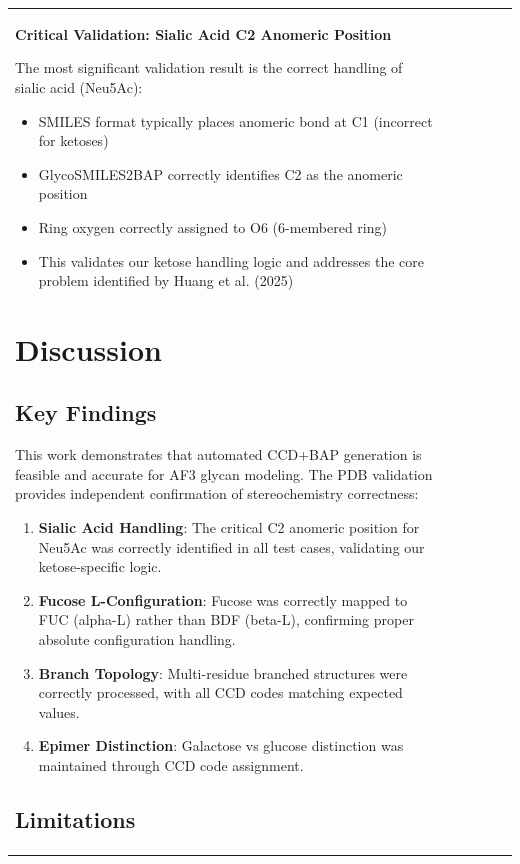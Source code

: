 \documentclass[11pt,a4paper]{article}
\begin{document}
\begin{table}[h]
\begin{tabular}{lccccc}
\textbf{Critical Validation: Sialic Acid C2 Anomeric Position}

The most significant validation result is the correct handling of sialic acid (Neu5Ac):
\begin{itemize}
\item SMILES format typically places anomeric bond at C1 (incorrect for ketoses)
\item GlycoSMILES2BAP correctly identifies C2 as the anomeric position
\item Ring oxygen correctly assigned to O6 (6-membered ring)
\item This validates our ketose handling logic and addresses the core problem identified by Huang et al. (2025)
\end{itemize}

\section{Discussion}

\subsection{Key Findings}

This work demonstrates that automated CCD+BAP generation is feasible and accurate for AF3 glycan modeling. The PDB validation provides independent confirmation of stereochemistry correctness:

\begin{enumerate}
\item \textbf{Sialic Acid Handling}: The critical C2 anomeric position for Neu5Ac was correctly identified in all test cases, validating our ketose-specific logic.

\item \textbf{Fucose L-Configuration}: Fucose was correctly mapped to FUC (alpha-L) rather than BDF (beta-L), confirming proper absolute configuration handling.

\item \textbf{Branch Topology}: Multi-residue branched structures were correctly processed, with all CCD codes matching expected values.

\item \textbf{Epimer Distinction}: Galactose vs glucose distinction was maintained through CCD code assignment.
\end{enumerate}

\subsection{Limitations}


\end{tabular}
\end{table}
\end{document}
